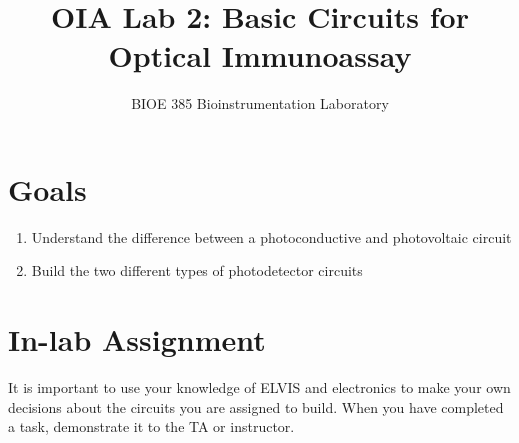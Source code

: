 \documentclass{article}
\title{OIA Lab 2: Basic Circuits for Optical Immunoassay}
\author{BIOE 385 Bioinstrumentation Laboratory}
\date{}
\begin{document}
\large
\maketitle

\section*{Goals}
\begin{enumerate}
	\item Understand the difference between a photoconductive and photovoltaic circuit
	\item Build the two different types of photodetector circuits
\end{enumerate}

\section*{In-lab Assignment}
It is important to use your knowledge of ELVIS and electronics to make your own decisions about the circuits you are assigned to build. When you have completed a task, demonstrate it to the TA or instructor.
\end{document}
